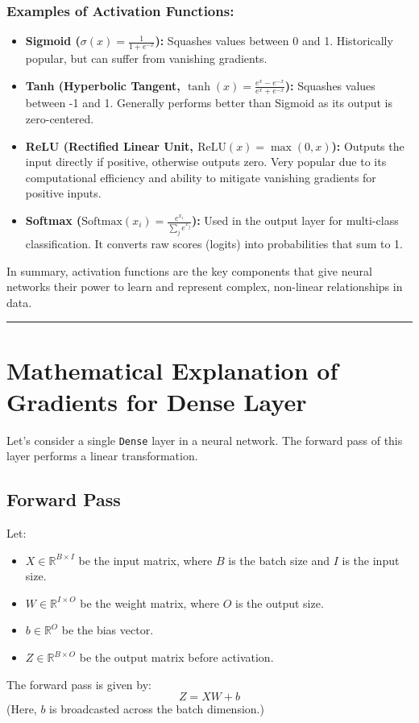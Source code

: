 \documentclass{article}
\begin{document}
\subsubsection*{Examples of Activation Functions:}
\begin{itemize}
    \item \textbf{Sigmoid ($\sigma(x) = \frac{1}{1 + e^{-x}}$):} Squashes values between 0 and 1. Historically popular, but can suffer from vanishing gradients.
    \item \textbf{Tanh (Hyperbolic Tangent, $\tanh(x) = \frac{e^x - e^{-x}}{e^x + e^{-x}}$):} Squashes values between -1 and 1. Generally performs better than Sigmoid as its output is zero-centered.
    \item \textbf{ReLU (Rectified Linear Unit, $\text{ReLU}(x) = \max(0, x)$):} Outputs the input directly if positive, otherwise outputs zero. Very popular due to its computational efficiency and ability to mitigate vanishing gradients for positive inputs.
    \item \textbf{Softmax ($\text{Softmax}(x_i) = \frac{e^{x_i}}{\sum_j e^{x_j}}$):} Used in the output layer for multi-class classification. It converts raw scores (logits) into probabilities that sum to 1.
\end{itemize}
In summary, activation functions are the key components that give neural networks their power to learn and represent complex, non-linear relationships in data.

\hrule %

\section*{Mathematical Explanation of Gradients for Dense Layer}

Let's consider a single \texttt{Dense} layer in a neural network.
The forward pass of this layer performs a linear transformation.

\subsection*{Forward Pass}
Let:
\begin{itemize}
    \item $X \in \mathbb{R}^{B \times I}$ be the input matrix, where $B$ is the batch size and $I$ is the input size.
    \item $W \in \mathbb{R}^{I \times O}$ be the weight matrix, where $O$ is the output size.
    \item $b \in \mathbb{R}^{O}$ be the bias vector.
    \item $Z \in \mathbb{R}^{B \times O}$ be the output matrix before activation.
\end{itemize}
The forward pass is given by:
$$ Z = XW + b $$
(Here, $b$ is broadcasted across the batch dimension.)
\end{document}
